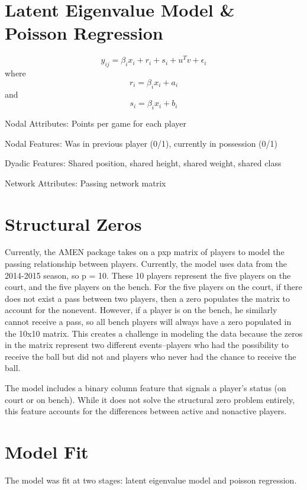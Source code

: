 \documentclass[12pt,twoside]{dukestatscithesis}
\theoremstyle{definition}
\theoremstyle{definition}
\theoremstyle{definition}
\theoremstyle{remark}
\begin{document}
\section{Latent Eigenvalue Model \& Poisson
Regression}\label{latent-eigenvalue-model-poisson-regression}

\[y_{ij} =  \beta_{i}x_{i} + r_{i} + s_{i} + u^{T}v + \epsilon_{i}\]
where \[r_{i} = \beta_{i}x_{i} + a_{i}\] and
\[s_{i} = \beta_{i}x_{i} + b_{i}\]

Nodal Attributes: Points per game for each player

Nodal Features: Was in previous player (0/1), currently in possession
(0/1)

Dyadic Features: Shared position, shared height, shared weight, shared
class

Network Attributes: Passing network matrix

\section{Structural Zeros}\label{structural-zeros}

Currently, the AMEN package takes on a pxp matrix of players to model
the passing relationship between players. Currently, the model uses data
from the 2014-2015 season, so p = 10. These 10 players represent the
five players on the court, and the five players on the bench. For the
five players on the court, if there does not exist a pass between two
players, then a zero populates the matrix to account for the nonevent.
However, if a player is on the bench, he similarly cannot receive a
pass, so all bench players will always have a zero populated in the
10x10 matrix. This creates a challenge in modeling the data because the
zeros in the matrix represent two different events--players who had the
possibility to receive the ball but did not and players who never had
the chance to receive the ball.

The model includes a binary column feature that signals a player's
status (on court or on bench). While it does not solve the structural
zero problem entirely, this feature accounts for the differences between
active and nonactive players.

\section{Model Fit}\label{model-fit}

The model was fit at two stages: latent eigenvalue model and poisson
regression.
\end{document}
